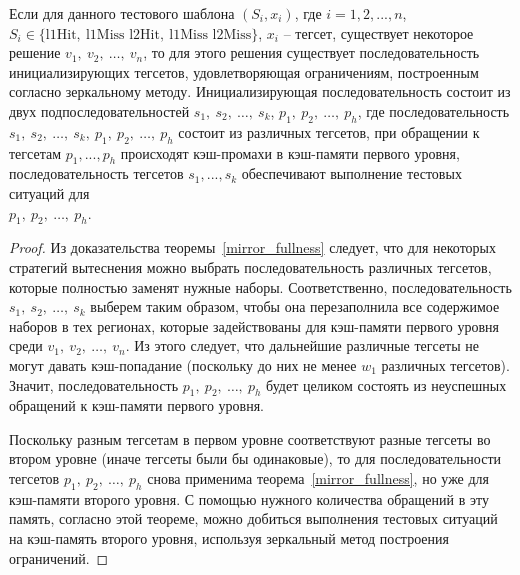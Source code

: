 \begin{lemma}\label{special_initialization_L2} Если для данного
тестового шаблона $(S_i, x_i)$, где $i = 1, 2, ..., n$,\\ $S_i \in
\{ \mbox{l1Hit},~\mbox{l1Miss l2Hit},~\mbox{l1Miss l2Miss} \}$,
$x_i$ -- тегсет, существует некоторое решение
$v_1,~v_2,~\dots,~v_n$, то для этого решения существует
последовательность инициализирующих тегсетов, удовлетворяющая
ограничениям, построенным согласно зеркальному методу.
Инициализирующая последовательность состоит из двух
подпоследовательностей $s_1,~s_2,~\dots,~s_k$,
$p_1,~p_2,~\dots,~p_h$, где последовательность
$s_1,~s_2,~\dots,~s_k,~p_1,~p_2,~\dots,~p_h$ состоит из различных
тегсетов, при обращении к тегсетам $p_1, ..., p_h$ происходят
кэш-промахи в кэш-памяти первого уровня, последовательность тегсетов
$s_1, ..., s_k$ обеспечивают выполнение тестовых ситуаций для\\
$p_1,~p_2,~\dots,~p_h$.
\end{lemma}
\begin{proof}
  Из доказательства теоремы~\ref{mirror_fullness} следует, что для
  некоторых стратегий вытеснения можно выбрать последовательность
  различных тегсетов, которые полностью заменят нужные наборы.
  Соответственно, последовательность $s_1,~s_2,~\dots,~s_k$ выберем
  таким образом, чтобы она перезаполнила все содержимое наборов в
  тех регионах, которые задействованы для кэш-памяти первого уровня
  среди $v_1,~v_2,~\dots,~v_n$. Из этого следует, что дальнейшие
  различные тегсеты не могут давать кэш-попадание (поскольку до них
  не менее $w_1$ различных тегсетов). Значит, последовательность
  $p_1,~p_2,~\dots,~p_h$ будет целиком состоять из неуспешных
  обращений к кэш-памяти первого уровня.

  Поскольку разным тегсетам в первом уровне соответствуют разные
  тегсеты во втором уровне (иначе тегсеты были бы одинаковые), то
  для последовательности тегсетов $p_1,~p_2,~\dots,~p_h$ снова
  применима теорема~\ref{mirror_fullness}, но уже для кэш-памяти
  второго уровня. С помощью нужного количества обращений в эту
  память, согласно этой теореме, можно добиться выполнения тестовых
  ситуаций на кэш-память второго уровня, используя зеркальный метод
  построения ограничений.
\end{proof}

